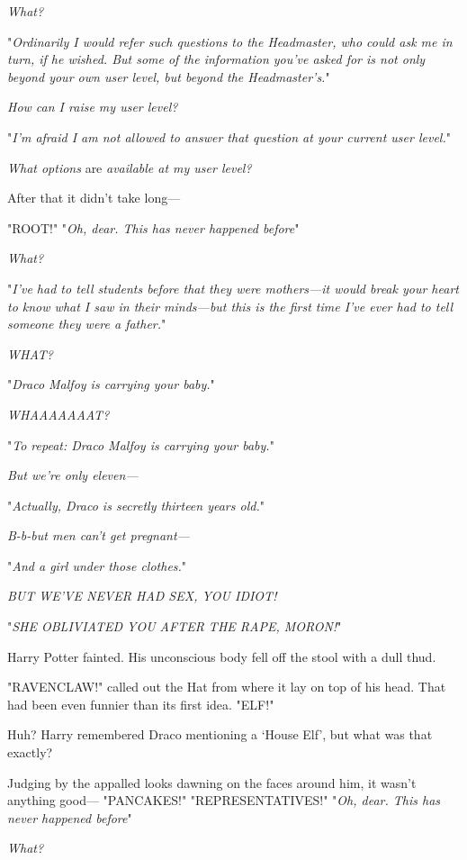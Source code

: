 \emph{What?}

"\emph{Ordinarily I would refer such questions to the Headmaster, who could ask
me in turn, if he wished. But some of the information you've asked for is not
only beyond your own user level, but beyond the Headmaster's.}"

\emph{How can I raise my user level?}

"\emph{I'm afraid I am not allowed to answer that question at your current user
level.}"

\emph{What options} are \emph{available at my user level?}

After that it didn't take long—

"ROOT!"
\sbreak
"\emph{Oh, dear. This has never happened before{\el}}"

\emph{What?}

"\emph{I've had to tell students before that they were mothers—it would break
your heart to know what I saw in their minds—but this is the first time I've
ever had to tell someone they were a father.}"

\emph{WHAT?}

"\emph{Draco Malfoy is carrying your baby.}"

\emph{WHAAAAAAAT?}

"\emph{To repeat: Draco Malfoy is carrying your baby.}"

\emph{But we're only eleven—}

"\emph{Actually, Draco is secretly thirteen years old.}"

\emph{B-b-but men can't get pregnant—}

"\emph{And a girl under those clothes.}"

\emph{BUT WE'VE NEVER HAD SEX, YOU IDIOT!}

"\emph{SHE OBLIVIATED YOU AFTER THE RAPE, MORON!}"

Harry Potter fainted. His unconscious body fell off the stool with a dull thud.

"RAVENCLAW!" called out the Hat from where it lay on top of his head. That had
been even funnier than its first idea.
\sbreak
"ELF!"

Huh? Harry remembered Draco mentioning a `House Elf', but what was that exactly?

Judging by the appalled looks dawning on the faces around him, it wasn't
anything good—
\sbreak
"PANCAKES!"
\sbreak
"REPRESENTATIVES!"
\sbreak
"\emph{Oh, dear. This has never happened before{\el}}"

\emph{What?}

